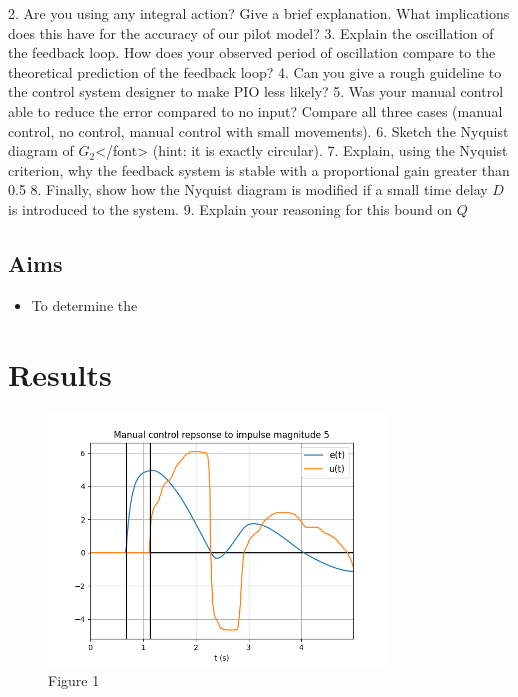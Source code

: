 \documentclass[8pt]{article}
\begin{document}
2. Are you using any integral action? Give a brief explanation. What implications does this have for the accuracy of our pilot model?
3. Explain the oscillation of the feedback loop. How does your observed period of oscillation compare to the theoretical prediction of the feedback loop?
4. Can you give a rough guideline to the control system designer to make PIO less likely?
5. Was your manual control able to reduce the error compared to no input? Compare all three cases (manual control, no control, manual control with small movements).
6. Sketch the Nyquist diagram of $G_2$</font> (hint: it is exactly circular).
7. Explain, using the Nyquist criterion, why the feedback system is stable with a proportional gain greater than 0.5
8. Finally, show how the Nyquist diagram is modified if a small time delay $D$ is introduced to the system.
9. Explain your reasoning for this bound on $Q$


\subsection{Aims}

\begin{itemize}
\item To determine the 
\end{itemize}

\section{Results}

\newpage

\begin{figure}
    \centering
    \includegraphics[width=0.8\textwidth]{figures/FIGURE_1.png}
    \caption{Figure 1}
    \label{fig:figure1}
\end{figure}
\end{document}
